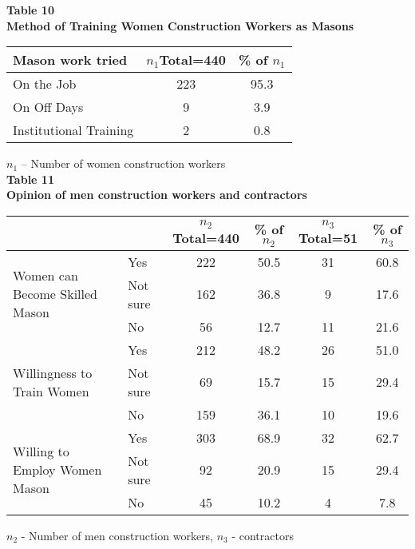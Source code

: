 \documentclass[12pt]{report}
\newcommand{\bt}[1]{\textbf{#1}}
\newcommand{\NI}{\noindent}
\begin{document}
	\NI\bt{Table 10}\\
	\bt{Method of Training Women Construction Workers as Masons}
	\begin{longtable}{p{}@{\hskip 0.3in}c@{\hskip 0.3in}c@{\hskip 0.3in}}
		\hline
		\bt{Mason work tried} & $n_1${\footnotesize Total=440} & {\footnotesize\% of }$n_1$\\ \hline
		On the Job &223 & 95.3\\
		On Off Days & 9 & 3.9\\
		Institutional Training & 2  & 0.8\\ \hline
	\end{longtable}
	$n_1$ – Number of women construction workers\\

	\NI\bt{Table 11}\\
	\bt{Opinion of men construction workers and contractors}
	\begin{longtable}{p{}@{\hskip 0.1in}l@{\hskip 0.1in}c@{\hskip 0.1in}c@{\hskip 0.1in}c@{\hskip 0.1in}c}
		\hline
		  & & $n_2${\footnotesize Total=440}  & {\footnotesize\% of }$n_2$   & $n_3${\footnotesize Total=51}  & {\footnotesize\% of }$n_3$\\ \hline
		\multirow{3}{=}{Women can Become Skilled Mason} & Yes & 222  & 50.5 & 31   & 60.8 \\
			& Not sure & 162 & 36.8 & 9 & 17.6\\
			& No & 56 & 12.7 & 11 & 21.6 \\ \hline
		\multirow{3}{=}{Willingness to Train Women} & Yes & 212 & 48.2 & 26 & 51.0 \\
		& Not sure & 69 & 15.7  & 15  & 29.4\\
		& No & 159 & 36.1 & 10 & 19.6 \\ \hline
		\multirow{3}{=}{Willing to  Employ  Women Mason} & Yes & 303 & 68.9 & 32 & 62.7 \\
		& Not sure & 92 & 20.9 & 15 & 29.4\\
		& No & 45 & 10.2 & 4 & 7.8 \\ \hline
	\end{longtable}
	$n_2$ - Number of men construction workers, $n_3$ - contractors\\
\end{document}
